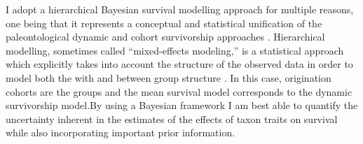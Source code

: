 \documentclass[12pt,letterpaper]{article}
\begin{document}
I adopt a hierarchical Bayesian survival modelling approach for multiple reasons, one being that it represents a conceptual and statistical unification of the paleontological dynamic and cohort survivorship approaches \citep{VanValen1973,VanValen1979,Raup1978,Raup1975,Foote1988,Baumiller1993,Simpson2006}. Hierarchical modelling, sometimes called ``mixed-effects modeling,'' is a statistical approach which explicitly takes into account the structure of the observed data in order to model both the with and between group structure \citep{Gelman2013d,Gelman2007}. In this case, origination cohorts are the groups and the mean survival model corresponds to the dynamic survivorship model.By using a Bayesian framework I am best able to quantify the uncertainty inherent in the estimates of the effects of taxon traits on survival while also incorporating important prior information.


\end{document}
